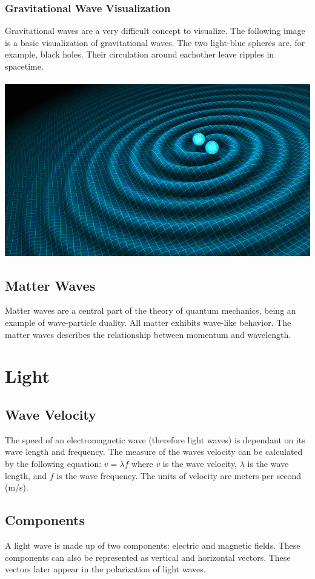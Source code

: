 \documentclass{article}
\begin{document}
\subsubsection{Gravitational Wave Visualization}
Gravitational waves are a very difficult concept to visualize. The following image is a basic visualization of gravitational waves. The two light-blue spheres are, for example, black holes. Their circulation around eachother leave ripples in spacetime.\\\\
\includegraphics[scale=0.33]{images/gravitational_waves.png}

\subsection{Matter Waves}
Matter waves are a central part of the theory of quantum mechanics, being an example of wave-particle duality. All matter exhibits wave-like behavior. The matter waves describes the relationship between momentum and wavelength.


\section{Light}
\subsection{Wave Velocity}
The speed of an electromagnetic wave (therefore light waves) is dependant on its wave length and frequency. The measure of the waves velocity can be calculated by the following equation: $v = \lambda f$ where $v$ is the wave velocity, $\lambda$ is the wave length, and $f$ is the wave frequency. The units of velocity are meters per second (m/s).

\subsection{Components}
A light wave is made up of two components: electric and magnetic fields. These components can also be represented as vertical and horizontal vectors. These vectors later appear in the polarization of light waves.
\end{document}
